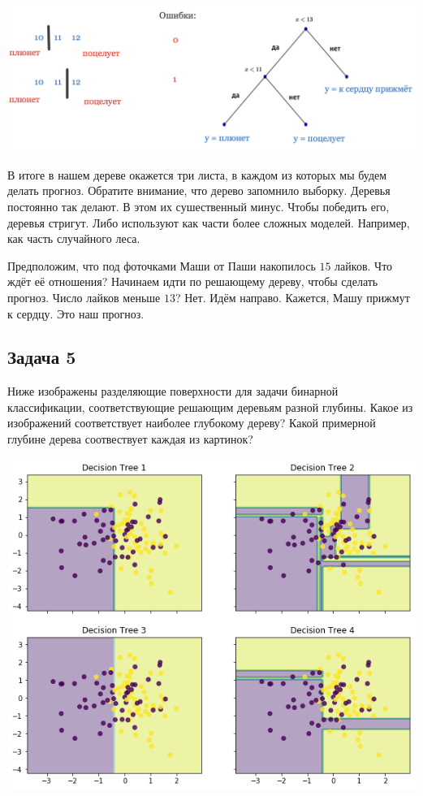 \documentclass[12pt, a4paper, oneside]{article}
\theoremstyle{plain} %
\theoremstyle{definition}
\begin{document}
{	\begin{center}
		\includegraphics[scale=0.28]{class_tree_2.png}
	\end{center} 	
	
	В итоге в нашем дереве окажется три листа, в каждом из которых мы будем делать прогноз. Обратите внимание, что дерево запомнило выборку.  Деревья постоянно так делают. В этом их сушественный минус. Чтобы победить его, деревья стригут. Либо используют как части более сложных моделей. Например, как часть случайного леса. 
	
	Предположим, что под фоточками Маши от Паши накопилось $15$ лайков. Что ждёт её отношения? Начинаем идти по решающему дереву, чтобы сделать прогноз. Число лайков меньше $13$? Нет. Идём направо. Кажется, Машу прижмут к сердцу. Это наш прогноз.  	
}






		



\subsection*{Задача 5} 

Ниже изображены разделяющие поверхности для задачи бинарной классификации, соответствующие решающим деревьям разной глубины. Какое из изображений соответствует наиболее глубокому дереву? Какой примерной глубине дерева соотвествует каждая из картинок? 

\begin{center}
	\includegraphics[scale=0.6]{trees.png}
\end{center}
\end{document}
